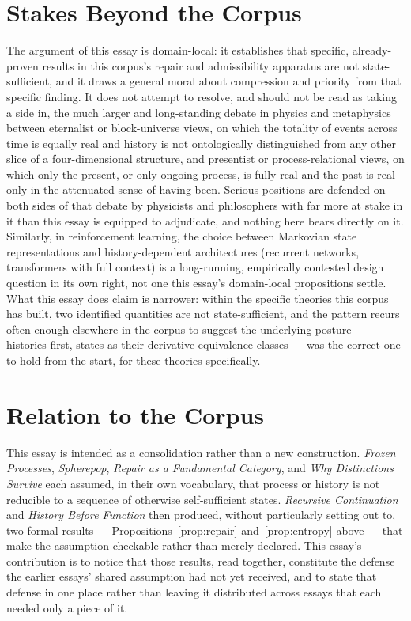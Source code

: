 \documentclass[11pt]{article}
\begin{document}
\section{Stakes Beyond the Corpus}

The argument of this essay is domain-local: it establishes that specific, already-proven results in this corpus's repair and admissibility apparatus are not state-sufficient, and it draws a general moral about compression and priority from that specific finding. It does not attempt to resolve, and should not be read as taking a side in, the much larger and long-standing debate in physics and metaphysics between eternalist or block-universe views, on which the totality of events across time is equally real and history is not ontologically distinguished from any other slice of a four-dimensional structure, and presentist or process-relational views, on which only the present, or only ongoing process, is fully real and the past is real only in the attenuated sense of having been. Serious positions are defended on both sides of that debate by physicists and philosophers with far more at stake in it than this essay is equipped to adjudicate, and nothing here bears directly on it. Similarly, in reinforcement learning, the choice between Markovian state representations and history-dependent architectures (recurrent networks, transformers with full context) is a long-running, empirically contested design question in its own right, not one this essay's domain-local propositions settle. What this essay does claim is narrower: within the specific theories this corpus has built, two identified quantities are not state-sufficient, and the pattern recurs often enough elsewhere in the corpus to suggest the underlying posture — histories first, states as their derivative equivalence classes — was the correct one to hold from the start, for these theories specifically.

\section{Relation to the Corpus}

This essay is intended as a consolidation rather than a new construction. \emph{Frozen Processes}, \emph{Spherepop}, \emph{Repair as a Fundamental Category}, and \emph{Why Distinctions Survive} each assumed, in their own vocabulary, that process or history is not reducible to a sequence of otherwise self-sufficient states. \emph{Recursive Continuation} and \emph{History Before Function} then produced, without particularly setting out to, two formal results — Propositions~\ref{prop:repair} and~\ref{prop:entropy} above — that make the assumption checkable rather than merely declared. This essay's contribution is to notice that those results, read together, constitute the defense the earlier essays' shared assumption had not yet received, and to state that defense in one place rather than leaving it distributed across essays that each needed only a piece of it.
\end{document}
